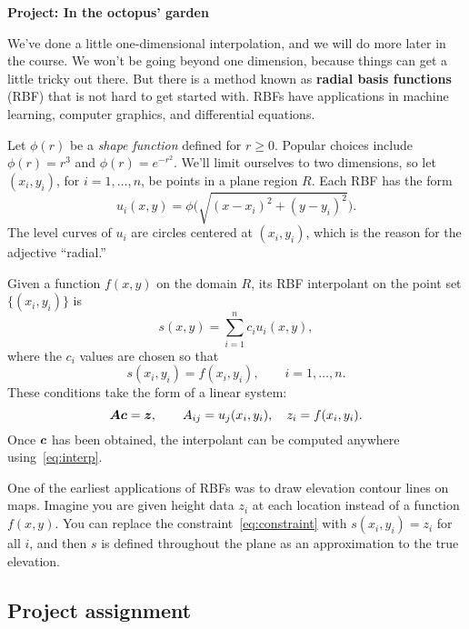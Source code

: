 \documentclass[11pt,letterpaper]{article}
\begin{document}
	
\begin{center}
  \bf
  Project: In the octopus' garden
\end{center}
	
We've done a little one-dimensional interpolation, and we will do more later in the course. We won't be going beyond one dimension, because things can get a little tricky out there. But there is a method known as \textbf{radial basis functions} (RBF) that is not hard to get started with. RBFs have applications in machine learning, computer graphics, and differential equations. 

Let $\phi(r)$ be a \emph{shape function} defined for $r\ge 0$. Popular choices include $\phi(r)=r^3$ and $\phi(r)=e^{-r^2}$. We'll limit ourselves to two dimensions, so let $(x_i,y_i)$, for $i=1,\ldots,n$, be points in a plane region $R$. Each RBF has the form
\begin{equation}
  \label{eq:rbf}
  u_i(x,y) = \phi\bigl( \sqrt{(x-x_i)^2+(y-y_i)^2} \bigr).
\end{equation}
The level curves of $u_i$ are circles centered at $(x_i,y_i)$, which is the reason for the adjective ``radial.''

Given a function $f(x,y)$ on the domain $R$, its RBF interpolant on the point set $\{(x_i,y_i)\}$ is 
\begin{equation}
  \label{eq:interp}
  s(x,y) = \sum_{i=1}^n c_i u_i(x,y),
\end{equation}
where the $c_i$ values are chosen so that
\begin{equation}
  \label{eq:constraint}
  s(x_i,y_i) = f(x_i,y_i), \qquad i=1,\ldots,n.
\end{equation}
These conditions take the form of a linear system:
\begin{equation}
  \label{eq:linsys}
  \bm{A} \bm{c} = \bm{z}, \qquad A_{ij}=u_j(x_i,y_i), \quad z_i=f(x_i,y_i).
\end{equation}
Once $\bm{c}$ has been obtained, the interpolant can be computed anywhere using~\eqref{eq:interp}. 


One of the earliest applications of RBFs was to draw elevation contour lines on maps. Imagine you are given height data $z_i$ at each location instead of a function $f(x,y)$. You can replace the constraint~\eqref{eq:constraint} with $s(x_i,y_i)=z_i$ for all $i$, and then $s$ is defined throughout the plane as an approximation to the true elevation. 

\subsection*{Project assignment}
\label{sec:project-assignment}
\end{document}
